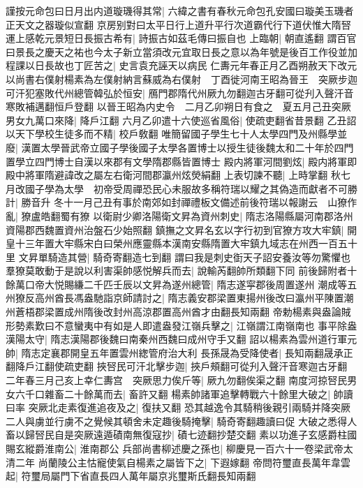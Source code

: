 謹按元命包曰日月出内道璇璣得其常|{
	六緯之書有春秋元命包孔安國曰璇美玉璣者正天文之器璇似宣翻}
京房别對曰太平日行上道升平行次道霸代行下道伏惟大隋唘運上感乾元景短日長振古希有|{
	詩振古如茲毛傳曰振自也}
上臨朝|{
	朝直遙翻}
謂百官曰景長之慶天之祐也今太子新立當須改元宜取日長之意以為年號是後百工作役並加程課以日長故也丁匠苦之|{
	史言袁充誣天以病民}
仁夀元年春正月乙酉朔赦天下改元　以尚書右僕射楊素為左僕射納言蘇威為右僕射　丁酉徙河南王昭為晉王　突厥步迦可汗犯塞敗代州總管韓弘於恒安|{
	鴈門郡隋代州厥九勿翻迦古牙翻可從刋入聲汗音寒敗補邁翻恒戶登翻}
以晉王昭為内史令　二月乙卯朔日有食之　夏五月己丑突厥男女九萬口來降|{
	降戶江翻}
六月乙卯遣十六使巡省風俗|{
	使疏吏翻省昔景翻}
乙丑詔以天下學校生徒多而不精|{
	校戶敎翻}
唯簡留國子學生七十人太學四門及州縣學並廢|{
	漢置太學晉武帝立國子學後國子太學各置博士以授生徒後魏太和二十年於四門置學立四門博士自漢以來郡有文學隋郡縣皆置博士}
殿内將軍河間劉炫|{
	殿内將軍即殿中將軍隋避諱改之屬左右衛河間郡瀛州炫熒絹翻}
上表切諫不聽|{
	上時掌翻}
秋七月改國子學為太學　初帝受周禪恐民心未服故多稱符瑞以耀之其偽造而獻者不可勝計|{
	勝音升}
冬十一月己丑有事於南郊如封禪禮板文備述前後符瑞以報謝云　山獠作亂|{
	獠盧皓翻蜀有獠}
以衛尉少卿洛陽衛文昇為資州刺史|{
	隋志洛陽縣屬河南郡洛州資陽郡西魏置資州治盤石少始照翻}
鎮撫之文昇名玄以字行初到官獠方攻大牢鎮|{
	開皇十三年置大牢縣宋白曰榮州應靈縣本漢南安縣隋置大牢鎮九域志在州西一百五十里}
文昇單騎造其營|{
	騎奇寄翻造七到翻}
謂曰我是刺史衘天子詔安養汝等勿驚懼也羣獠莫敢動于是說以利害渠帥感悦解兵而去|{
	說輸芮翻帥所類翻下同}
前後歸附者十餘萬口帝大悦賜縑二千匹壬辰以文昇為遂州總管|{
	隋志遂寜郡後周置遂州}
潮成等五州獠反高州酋長馮盎馳詣京師請討之|{
	隋志義安郡梁置東揚州後改曰瀛州平陳置潮州蒼梧郡梁置成州隋後改封州高涼郡置高州酋才由翻長知兩翻}
帝勅楊素與盎論賊形勢素歎曰不意蠻夷中有如是人即遣盎發江嶺兵擊之|{
	江嶺謂江南嶺南也}
事平除盎漢陽太守|{
	隋志漢陽郡後魏曰南秦州西魏曰成州守手又翻}
詔以楊素為雲州道行軍元帥|{
	隋志定襄郡開皇五年置雲州緫管府治大利}
長孫晟為受降使者|{
	長知兩翻晟承正翻降戶江翻使疏吏翻}
挾唘民可汗北擊步迦|{
	挾戶頰翻可從刋入聲汗音寒迦古牙翻}
二年春三月己亥上幸仁夀宫　突厥思力俟斤等|{
	厥九勿翻俟渠之翻}
南度河掠唘民男女六千口雜畜二十餘萬而去|{
	畜許又翻}
楊素帥諸軍追擊轉戰六十餘里大破之|{
	帥讀曰率}
突厥北走素復進追夜及之|{
	復扶又翻}
恐其越逸令其騎稍後親引兩騎并降突厥二人與虜並行虜不之覺候其頓舍未定趣後騎掩擊|{
	騎奇寄翻趣讀曰促}
大破之悉得人畜以歸唘民自是突厥遠遁磧南無復寇抄|{
	磧七迹翻抄楚交翻}
素以功進子玄感爵柱國賜玄縱爵淮南公|{
	淮南郡公}
兵部尚書柳述慶之孫也|{
	柳慶見一百六十一卷梁武帝太清二年}
尚蘭陵公主怙寵使氣自楊素之屬皆下之|{
	下遐嫁翻}
帝問符璽直長萬年韋雲起|{
	符璽局屬門下省直長四人萬年屬京兆璽斯氏翻長知兩翻}
